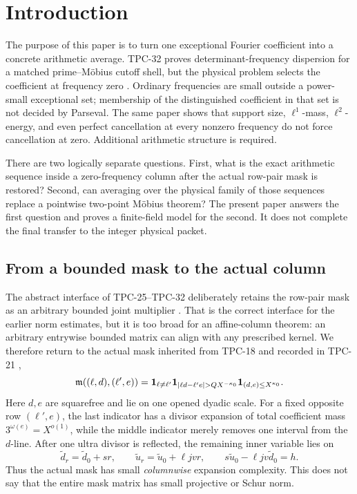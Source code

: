 \section{Introduction}
\label{sec:tpc33-introduction}

The purpose of this paper is to turn one exceptional Fourier coefficient
into a concrete arithmetic average.  TPC-32 proves determinant-frequency
dispersion for a matched prime--M\"obius cutoff shell, but the physical
problem selects the coefficient at frequency zero
\citep{WangTPC32}.  Ordinary frequencies are small outside a power-small
exceptional set; membership of the distinguished coefficient in that set
is not decided by Parseval.  The same paper shows that support size,
\(\ell^1\)-mass, \(\ell^2\)-energy, and even perfect cancellation at every
nonzero frequency do not force cancellation at zero.  Additional
arithmetic structure is required.

There are two logically separate questions.  First, what is the exact
arithmetic sequence inside a zero-frequency column after the actual
row-pair mask is restored?  Second, can averaging over the physical family
of those sequences replace a pointwise two-point M\"obius theorem?  The
present paper answers the first question and proves a finite-field model
for the second.  It does not complete the final transfer to the integer
physical packet.

\subsection{From a bounded mask to the actual column}

The abstract interface of TPC-25--TPC-32 deliberately retains the row-pair
mask as an arbitrary bounded joint multiplier
\citep{WangTPC25,WangTPC32}.  That is the correct interface for the earlier
norm estimates, but it is too broad for an affine-column theorem: an
arbitrary entrywise bounded matrix can align with any prescribed kernel.
We therefore return to the actual mask inherited from TPC-18 and recorded
in TPC-21 \citep{WangTPC21},
\begin{equation}
 \mathfrak m((\ell,d),(\ell',e))
 =\one_{\ell\ne\ell'}
  \one_{|\ell d-\ell'e|>QX^{-\kappa_0}}
  \one_{(d,e)\le X^{\kappa_0}}.
 \label{eq:tpc33-intro-actual-mask}
\end{equation}
Here \(d,e\) are squarefree and lie on one opened dyadic scale.  For a
fixed opposite row \((\ell',e)\), the last indicator has a divisor
expansion of total coefficient mass \(3^{\omega(e)}=X^{o(1)}\), while the
middle indicator merely removes one interval from the \(d\)-line.  After
one ultra divisor is reflected, the remaining inner variable lies on
\begin{equation}
 \widetilde d_r=\widetilde d_0+sr,
 \qquad
 \widetilde u_r=\widetilde u_0+\ell jv r,
 \qquad
 s\widetilde u_0-\ell jv\widetilde d_0=h.
 \label{eq:tpc33-intro-affine-column}
\end{equation}
Thus the actual mask has small \emph{columnwise} expansion complexity.
This does not say that the entire mask matrix has small projective or Schur
norm.

